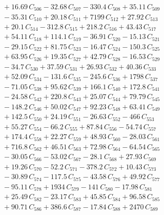 \documentclass[a4paper,11pt]{article}
\begin{document}
\begin{align}
&\quad + 16.69\,C_{506} - 32.68\,C_{507} - 330.4\,C_{508} + 35.11\,C_{509} \nonumber\\
&\quad - 35.31\,C_{510} + 20.18\,C_{511} + 7199\,C_{512} + 27.92\,C_{513} \nonumber\\
&\quad + 20.1\,C_{514} - 312.8\,C_{515} + 218.2\,C_{516} + 43.43\,C_{517} \nonumber\\
&\quad + 54.11\,C_{518} + 114.1\,C_{519} - 36.91\,C_{520} - 15.13\,C_{521} \nonumber\\
&\quad - 29.15\,C_{522} + 81.75\,C_{523} - 16.47\,C_{524} - 150.3\,C_{525} \nonumber\\
&\quad + 63.95\,C_{526} + 19.35\,C_{527} + 42.79\,C_{528} - 16.53\,C_{529} \nonumber\\
&\quad - 34.7\,C_{530} + 37.59\,C_{531} + 26.93\,C_{532} + 40.36\,C_{533} \nonumber\\
&\quad + 52.09\,C_{534} - 131.6\,C_{535} - 245.6\,C_{536} + 1798\,C_{537} \nonumber\\
&\quad - 71.05\,C_{538} + 95.62\,C_{539} + 166.1\,C_{540} + 172.8\,C_{541} \nonumber\\
&\quad - 24.58\,C_{542} + 220.8\,C_{543} + 25.07\,C_{544} + 79.79\,C_{545} \nonumber\\
&\quad - 148.2\,C_{546} + 50.02\,C_{547} + 92.23\,C_{548} + 63.41\,C_{549} \nonumber\\
&\quad + 142.5\,C_{550} + 24.19\,C_{551} - 26.63\,C_{552} - 466\,C_{553} \nonumber\\
&\quad + 55.27\,C_{554} - 66.2\,C_{555} + 87.84\,C_{556} - 54.74\,C_{557} \nonumber\\
&\quad + 174.4\,C_{558} + 22.27\,C_{559} + 48.93\,C_{560} - 28.03\,C_{561} \nonumber\\
&\quad + 716.8\,C_{562} + 46.51\,C_{563} + 72.98\,C_{564} - 64.54\,C_{565} \nonumber\\
&\quad - 30.05\,C_{566} - 53.02\,C_{567} - 28.1\,C_{568} + 27.93\,C_{569} \nonumber\\
&\quad + 19.26\,C_{570} - 52.2\,C_{571} - 378.2\,C_{572} + 10.43\,C_{573} \nonumber\\
&\quad - 30.89\,C_{574} - 117.5\,C_{575} - 43.58\,C_{576} + 49.92\,C_{577} \nonumber\\
&\quad - 95.11\,C_{578} + 1934\,C_{579} - 141\,C_{580} - 17.98\,C_{581} \nonumber\\
&\quad + 25.49\,C_{582} - 23.17\,C_{583} + 45.85\,C_{584} + 96.58\,C_{585} \nonumber\\
&\quad + 90.71\,C_{586} + 386.6\,C_{587} - 17.84\,C_{588} + 2470\,C_{589} \nonumber\\

\end{align}
\end{document}
